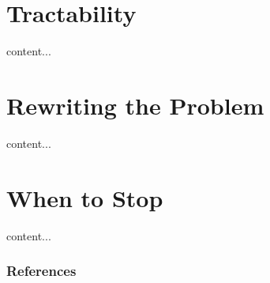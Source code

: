 \documentclass[10pt,compress,xcolor={usenames,dvipsnames}]{beamer} %
\begin{document}
\section{Tractability}

\begin{frame}
	content...
\end{frame}


\section{Rewriting the Problem}

\begin{frame}
	content...
\end{frame}


\section{When to Stop}
\begin{frame}
	content...
\end{frame}


\begin{frame}[allowframebreaks]\frametitle{References}
	
\end{frame}
\end{document}
